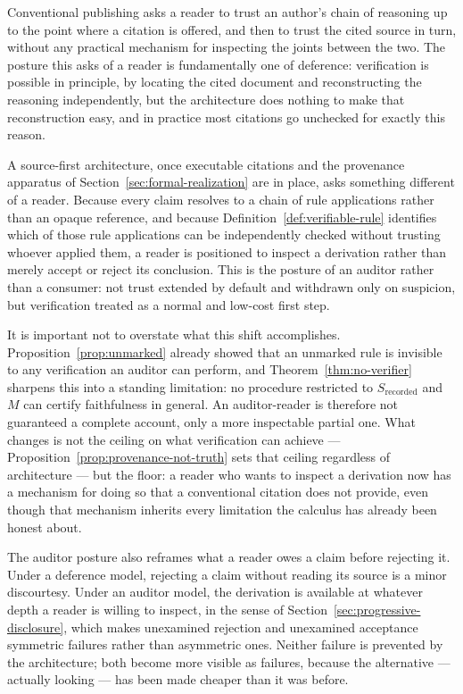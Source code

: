 \documentclass[11pt]{article}
\theoremstyle{definition}
\begin{document}
Conventional publishing asks a reader to trust an author's chain of reasoning up to the point where a citation is offered, and then to trust the cited source in turn, without any practical mechanism for inspecting the joints between the two. The posture this asks of a reader is fundamentally one of deference: verification is possible in principle, by locating the cited document and reconstructing the reasoning independently, but the architecture does nothing to make that reconstruction easy, and in practice most citations go unchecked for exactly this reason.

A source-first architecture, once executable citations and the provenance apparatus of Section~\ref{sec:formal-realization} are in place, asks something different of a reader. Because every claim resolves to a chain of rule applications rather than an opaque reference, and because Definition~\ref{def:verifiable-rule} identifies which of those rule applications can be independently checked without trusting whoever applied them, a reader is positioned to inspect a derivation rather than merely accept or reject its conclusion. This is the posture of an auditor rather than a consumer: not trust extended by default and withdrawn only on suspicion, but verification treated as a normal and low-cost first step.

It is important not to overstate what this shift accomplishes. Proposition~\ref{prop:unmarked} already showed that an unmarked rule is invisible to any verification an auditor can perform, and Theorem~\ref{thm:no-verifier} sharpens this into a standing limitation: no procedure restricted to $S_{\mathrm{recorded}}$ and $M$ can certify faithfulness in general. An auditor-reader is therefore not guaranteed a complete account, only a more inspectable partial one. What changes is not the ceiling on what verification can achieve --- Proposition~\ref{prop:provenance-not-truth} sets that ceiling regardless of architecture --- but the floor: a reader who wants to inspect a derivation now has a mechanism for doing so that a conventional citation does not provide, even though that mechanism inherits every limitation the calculus has already been honest about.

The auditor posture also reframes what a reader owes a claim before rejecting it. Under a deference model, rejecting a claim without reading its source is a minor discourtesy. Under an auditor model, the derivation is available at whatever depth a reader is willing to inspect, in the sense of Section~\ref{sec:progressive-disclosure}, which makes unexamined rejection and unexamined acceptance symmetric failures rather than asymmetric ones. Neither failure is prevented by the architecture; both become more visible as failures, because the alternative --- actually looking --- has been made cheaper than it was before.
\end{document}
